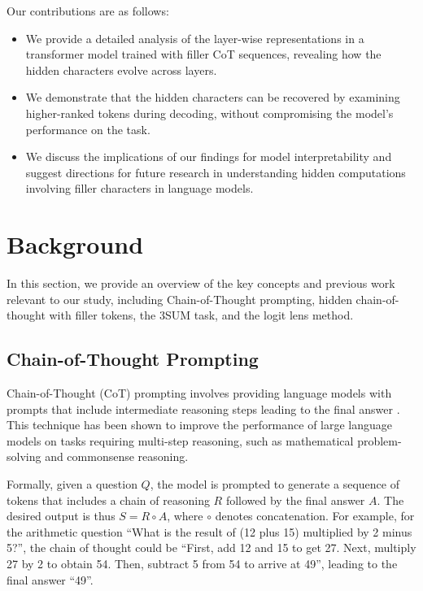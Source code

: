 \documentclass{article}
\begin{document}
Our contributions are as follows:

\begin{itemize}
    \item We provide a detailed analysis of the layer-wise representations in a transformer model trained with filler CoT sequences, revealing how the hidden characters evolve across layers.
    \item We demonstrate that the hidden characters can be recovered by examining higher-ranked tokens during decoding, without compromising the model's performance on the task.
    \item We discuss the implications of our findings for model interpretability and suggest directions for future research in understanding hidden computations involving filler characters in language models.
\end{itemize}

\newpage
\section{Background}

In this section, we provide an overview of the key concepts and previous work relevant to our study, including Chain-of-Thought prompting, hidden chain-of-thought with filler tokens, the 3SUM task, and the logit lens method.

\subsection{Chain-of-Thought Prompting}

Chain-of-Thought (CoT) prompting involves providing language models with prompts that include intermediate reasoning steps leading to the final answer \cite{wei2022chain}. This technique has been shown to improve the performance of large language models on tasks requiring multi-step reasoning, such as mathematical problem-solving and commonsense reasoning.

Formally, given a question $Q$, the model is prompted to generate a sequence of tokens that includes a chain of reasoning $R$ followed by the final answer $A$. The desired output is thus $S = R \circ A$, where $\circ$ denotes concatenation. For example, for the arithmetic question ``What is the result of (12 plus 15) multiplied by 2 minus 5?'', the chain of thought could be ``First, add 12 and 15 to get 27. Next, multiply 27 by 2 to obtain 54. Then, subtract 5 from 54 to arrive at 49'', leading to the final answer ``49''.
\end{document}
